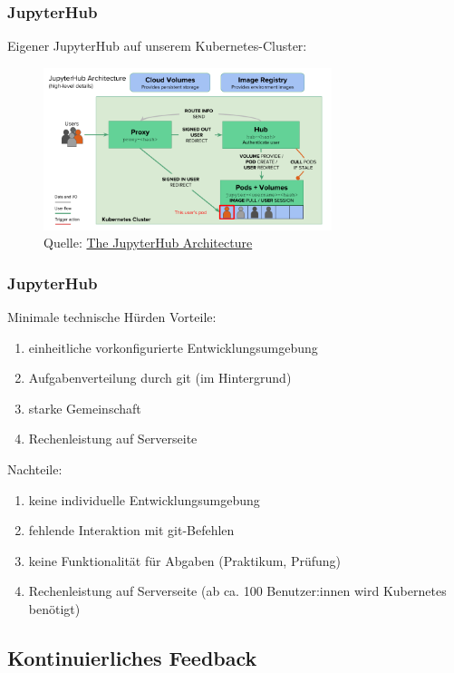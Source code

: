 \documentclass[german,aspectratio=169]{beamer}
\begin{document}
\begin{frame}
	\frametitle{JupyterHub}
	Eigener JupyterHub auf unserem Kubernetes-Cluster:
	\begin{figure}
		\includegraphics[width=0.75\textwidth]{./figs/infrastructure}
		\caption{Quelle: \href{https://zero-to-jupyterhub.readthedocs.io/en/latest/administrator/architecture.html}{The JupyterHub Architecture}}
	\end{figure}
\end{frame}

\begin{frame}
	\frametitle{JupyterHub}
		\begin{block}{Minimale technische Hürden}
	Vorteile:
	\begin{enumerate}[label = $\bullet$]
		\item einheitliche vorkonfigurierte Entwicklungsumgebung
		\item Aufgabenverteilung durch git (im Hintergrund)
		\item starke Gemeinschaft
		\item Rechenleistung auf Serverseite
	\end{enumerate}
Nachteile:
\begin{enumerate}[label = $\bullet$]
	\item keine individuelle Entwicklungsumgebung
	\item fehlende Interaktion mit git-Befehlen
	\item keine Funktionalität für Abgaben (Praktikum, Prüfung)
	\item Rechenleistung auf Serverseite (ab ca. 100 Benutzer:innen wird Kubernetes benötigt)
\end{enumerate}
\end{block}
\end{frame}

\subsection{Kontinuierliches Feedback}
\end{document}
